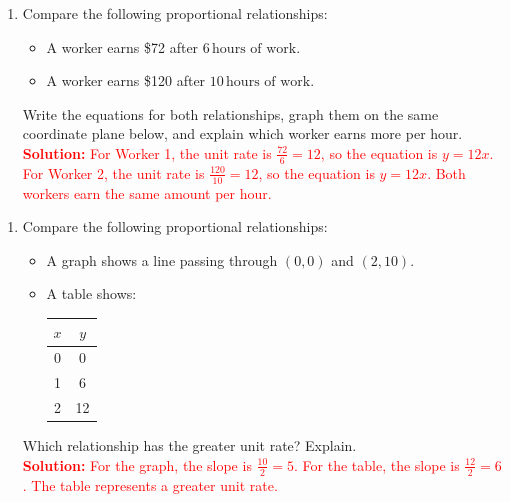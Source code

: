 \documentclass[12pt]{article}
\begin{document}
\begin{tcolorbox}[colframe=black!60, colback=white, 
coltitle=black, colbacktitle=black!15, fonttitle=\bfseries\Large, 
title=Exercises: Graphing and Comparison, halign title=center, left=10pt, right=10pt, top=10pt, bottom=60pt]
\begin{enumerate}[itemsep=3em, start=4]
    \item Compare the following proportional relationships:
    \begin{itemize}
        \item A worker earns \$72 after \(6 \, \text{hours of work}\).
        \item A worker earns \$120 after \(10 \, \text{hours of work}\).
    \end{itemize}
    Write the equations for both relationships, graph them on the same coordinate plane below, and explain which worker earns more per hour.\\
    \textcolor{red}{\textbf{Solution:} For Worker 1, the unit rate is \(\frac{72}{6} = 12\), so the equation is \(y = 12x\). For Worker 2, the unit rate is \(\frac{120}{10} = 12\), so the equation is \(y = 12x\). Both workers earn the same amount per hour.}
\end{enumerate}
\end{tcolorbox}

\begin{tcolorbox}[colframe=black!60, colback=white, 
coltitle=black, colbacktitle=black!15, fonttitle=\bfseries\Large, 
title=Problems, halign title=center, left=10pt, right=10pt, top=10pt, bottom=60pt]
\begin{enumerate}[itemsep=3em]
    \item Compare the following proportional relationships:
    \begin{itemize}
        \item A graph shows a line passing through \((0, 0)\) and \((2, 10)\).
        \item A table shows:
        \begin{tabular}{|c|c|}
        \hline
        \(x\) & \(y\) \\
        \hline
        0 & 0 \\
        1 & 6 \\
        2 & 12 \\
        \hline
        \end{tabular}
    \end{itemize}
    Which relationship has the greater unit rate? Explain.\\
    \textcolor{red}{\textbf{Solution:} For the graph, the slope is \(\frac{10}{2} = 5\). For the table, the slope is \(\frac{12}{2} = 6\). The table represents a greater unit rate.}
\end{enumerate}
\end{tcolorbox}
\end{document}
